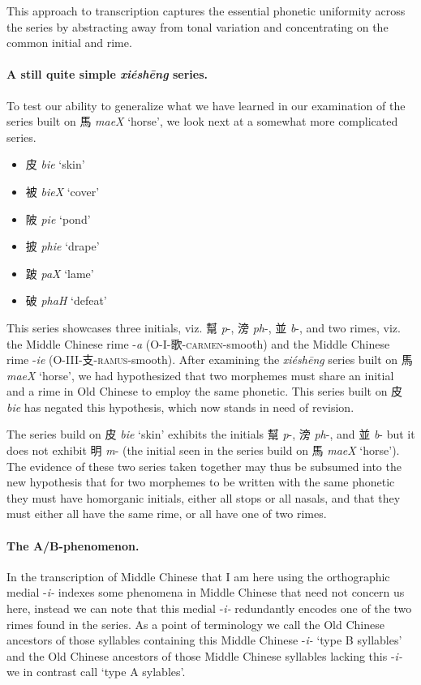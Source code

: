 This approach to transcription captures the essential phonetic uniformity across the series by abstracting away from tonal variation and concentrating on the common initial and rime. 

\paragraph{A still quite simple \textit{xiéshēng} series.}
\label{par:still-simple-XS-series}
To test our ability to generalize what we have learned in our examination of the series built on 馬 \textit{maeX} `horse', we look next at a somewhat more complicated series. 

\begin{itemize}
    \item {\Large{皮}} \textit{bie} `skin'
    \item {\Large{被}} \textit{bieX} `cover'
    \item {\Large{陂}} \textit{pie} `pond'
    \item {\Large{披}} \textit{phie} `drape'
    \item {\Large{跛}} \textit{paX} `lame'
    \item {\Large{破}} \textit{phaH} `defeat'
\end{itemize}

This series showcases three initials, viz. 幫 \textit{p}-, 滂 \textit{ph}-, 並
\textit{b}-, and two rimes, viz. the Middle Chinese %
rime -\textit{a} (O-I-歌-\textsc{carmen}-smooth) and the Middle Chinese 
rime -\textit{ie} (O-III-支-\textsc{ramus}-smooth). After examining the \textit{xiéshēng} series built on 馬 \textit{maeX} `horse', we had  hypothesized that two morphemes must share an initial and a rime in Old Chinese to employ the same phonetic. This series built on 皮 \textit{bie} has negated this hypothesis, which now stands in need of revision. 

The series build on 皮 \textit{bie} `skin' exhibits the initials 
幫 \textit{p}-, 滂 \textit{ph}-, and 並
\textit{b}- but it does not exhibit 明 \textit{m}- (the initial seen in the series build on 馬 \textit{maeX} `horse'). The evidence of these two series taken together may thus be subsumed into the new hypothesis that for two morphemes to be written with the same phonetic they must have homorganic initials, either all stops or all nasals, and that they must either all have the same rime, or all have one of two rimes.  

\paragraph{The A/B-phenomenon.}
\label{par:A/B-phenomenon}
In the transcription of Middle Chinese that I am here using the orthographic medial -\textit{i-} indexes some phenomena in Middle Chinese that need not concern us here, instead we can note that this medial -\textit{i-} redundantly encodes one of the two rimes found in the series. As a point of terminology we call the Old Chinese ancestors of those syllables containing this Middle Chinese -\textit{i-} `type B syllables' and the Old Chinese ancestors of those Middle Chinese syllables lacking this -\textit{i-} we in contrast call `type A sylables'. 

